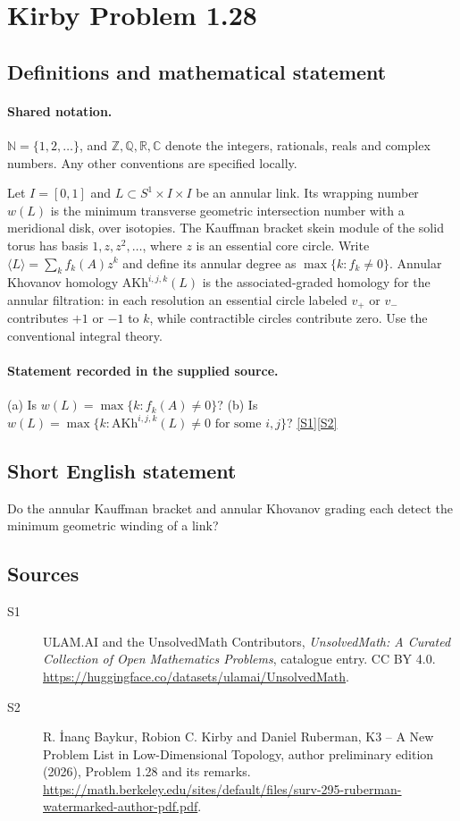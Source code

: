 \documentclass[11pt]{article}
\newcommand{\sref}[2]{\hyperlink{source:#1:#2}{[S#2]}}
\begin{document}
\section{Kirby Problem 1.28}\label{statement}

\subsection{Definitions and mathematical statement}

\paragraph{Shared notation.}$\mathbb N=\{1,2,\ldots\}$, and $\mathbb Z,\mathbb Q,\mathbb R,\mathbb C$ denote the integers, rationals, reals and complex numbers. Any other conventions are specified locally.


Let $I=[0,1]$ and $L\subset S^1\times I\times I$ be an annular link. Its wrapping number $w(L)$ is the minimum transverse geometric intersection number with a meridional disk, over isotopies. The Kauffman bracket skein module of the solid torus has basis $1,z,z^2,\ldots$, where $z$ is an essential core circle. Write $\langle L\rangle=\sum_k f_k(A)z^k$ and define its annular degree as $\max\{k:f_k\ne0\}$. Annular Khovanov homology $\mathrm{AKh}^{i,j,k}(L)$ is the associated-graded homology for the annular filtration: in each resolution an essential circle labeled $v_+$ or $v_-$ contributes $+1$ or $-1$ to $k$, while contractible circles contribute zero. Use the conventional integral theory.
\paragraph{Statement recorded in the supplied source.}
(a) Is $w(L)=\max\{k:f_k(A)\ne0\}$? (b) Is $w(L)=\max\{k:\mathrm{AKh}^{i,j,k}(L)\ne0\text{ for some }i,j\}$? \sref{statement}{1}\sref{statement}{2}
\subsection{Short English statement}
Do the annular Kauffman bracket and annular Khovanov grading each detect the minimum geometric winding of a link?
\subsection{Sources}
\begin{description}
\item[\hypertarget{source:statement:1}{S1}] ULAM.AI and the UnsolvedMath Contributors, \emph{UnsolvedMath: A Curated Collection of Open Mathematics Problems}, catalogue entry. CC BY 4.0. \url{https://huggingface.co/datasets/ulamai/UnsolvedMath}.
\item[\hypertarget{source:statement:2}{S2}] R. \.{I}nan\c{c} Baykur, Robion C. Kirby and Daniel Ruberman, K3 -- A New Problem List in Low-Dimensional Topology, author preliminary edition (2026), Problem 1.28 and its remarks. \url{https://math.berkeley.edu/sites/default/files/surv-295-ruberman-watermarked-author-pdf.pdf}.
\end{description}
\label{end:statement}
\end{document}

